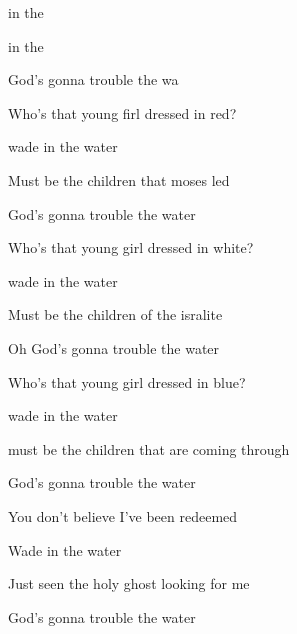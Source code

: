 

\zr
{}   in the  
 
   in the   

    

God's gonna trouble the wa
\kr

\zs
Who's that young firl dressed in red?

wade in the water

Must be the children that moses led

God's gonna trouble the water
\ks

\zr\kr

\zs
Who's that young girl dressed in white?

wade in the water

Must be the children of the isralite

Oh God's gonna trouble the water
\ks

\zr\kr

\zs
Who's that young girl dressed in blue?

wade in the water

must be the children that are coming through

God's gonna trouble the water
\ks

\zr\kr

\zs
You don't believe I've been redeemed

Wade in the water 

Just seen the holy ghost looking for me

God's gonna trouble the water
\ks

\zr\kr

\kp
